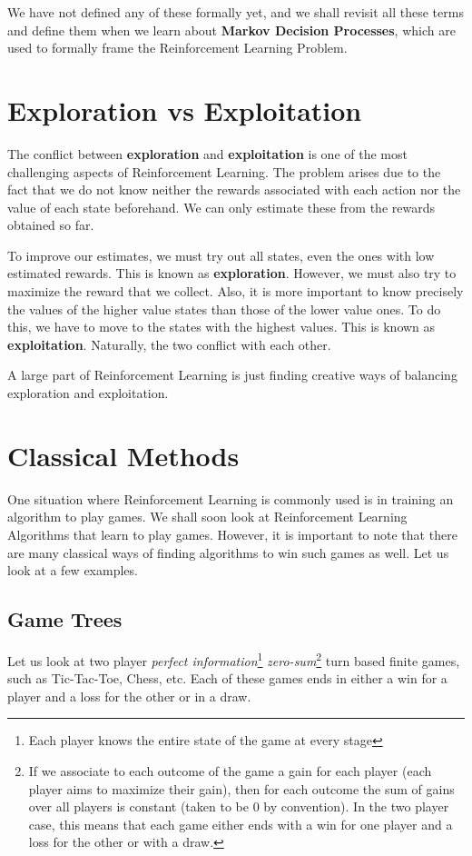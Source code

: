 \documentclass[12pt]{report}
\begin{document}
We have not defined any of these formally yet, and we shall revisit all these terms and define them when we learn about \textbf{Markov Decision Processes}, which are used to formally frame the Reinforcement Learning Problem.

\section{Exploration vs Exploitation}
The conflict between \textbf{exploration} and \textbf{exploitation} is one of the most challenging aspects of Reinforcement Learning.
The problem arises due to the fact that we do not know neither the rewards associated with each action nor the value of each state beforehand.
We can only estimate these from the rewards obtained so far.

To improve our estimates, we must try out all states, even the ones with low estimated rewards. This is known as \textbf{exploration}.
However, we must also try to maximize the reward that we collect. Also, it is more important to know precisely the values of the higher value states than those of the lower value ones. 
To do this, we have to move to the states with the highest values. This is known as \textbf{exploitation}.
Naturally, the two conflict with each other. 

A large part of Reinforcement Learning is just finding creative ways of balancing exploration and exploitation.

\section{Classical Methods}
One situation where Reinforcement Learning is commonly used is in training an algorithm to play games. We shall soon look at Reinforcement Learning Algorithms that learn
to play games. However, it is important to note that there are many classical ways of finding algorithms to win such games as well. Let us look at a few examples.
\subsection{Game Trees}

Let us look at two player \textit{perfect information}\footnote{Each player knows the entire state of the game at every stage} \textit{zero-sum}\footnote{If we associate to each outcome of the game a gain for each player (each player aims to maximize their gain), then for each outcome the sum of gains over all players is constant (taken to be $0$ by convention). In the two player case, this means that each game either ends with a win for one player and a loss for the other or with a draw.} turn based finite games, such as Tic-Tac-Toe, Chess, etc. Each of these games ends in either a win for a player and a loss for the other or in a draw.
\end{document}
